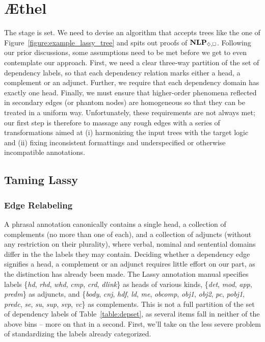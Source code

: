 \section{\AE thel}
\label{section:aethel}
The stage is set.
We need to devise an algorithm that accepts trees like the one of Figure~\ref{figure:example_lassy_tree} and spits out proofs of $\NLP_{\diamond,\bx}$.
Following our prior discussions, some assumptions need to be met before we get to even contemplate our approach.
First, we need a clear three-way partition of the set of dependency labels, so that each dependency relation marks either a head, a complement or an adjunct.
Further, we require that each dependency domain has exactly one head.
Finally, we must ensure that higher-order phenomena reflected in secondary edges (or phantom nodes) are homogeneous so that they can be treated in a uniform way.
Unfortunately, these requirements are not always met; our first step is therefore to massage any rough edges with a series of transformations aimed at (i) harmonizing the input trees with the target logic and (ii) fixing inconsistent formattings and underspecified or otherwise incompatible annotations. 

\subsection{Taming Lassy}
\subsubsection{Edge Relabeling}
A phrasal annotation canonically contains a single head, a collection of complements (no more than one of each), and a collection of adjuncts (without any restriction on their plurality), where verbal, nominal and sentential domains differ in the the labels they may contain.
Deciding whether a dependency edge signifies a head, a complement or an adjunct requires little effort on our part, as the distinction has already been made.
The Lassy annotation manual specifies labels \{\textit{hd}, \textit{rhd}, \textit{whd}, \textit{cmp}, \textit{crd}, \textit{dlink}\} as heads of various kinds, \{\textit{det}, \textit{mod}, \textit{app}, \textit{predm}\} as adjuncts, and \{\textit{body}, \textit{cnj}, \textit{hdf}, \textit{ld}, \textit{me}, \textit{obcomp}, \textit{obj1}, \textit{obj2}, \textit{pc}, \textit{pobj1}, \textit{predc}, \textit{se}, \textit{su}, \textit{sup}, \textit{svp}, \textit{vc}\} as complements.
This is not a full partition of the set of dependency labels of Table~\ref{table:depset}, as several items fall in neither of the above bins -- more on that in a second.
First, we'll take on the less severe problem of standardizing the labels already categorized.

